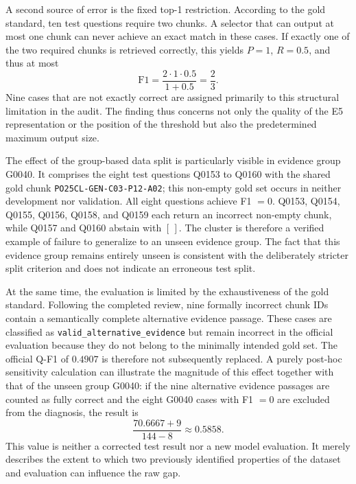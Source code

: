 \documentclass[11pt]{article}
\begin{document}
A second source of error is the fixed top-1 restriction. According to the gold standard, ten test questions require two chunks. A selector that can output at most one chunk can never achieve an exact match in these cases. If exactly one of the two required chunks is retrieved correctly, this yields $P=1$, $R=0.5$, and thus at most
\begin{equation}
\mathrm{F1}=\frac{2\cdot1\cdot0.5}{1+0.5}=\frac{2}{3}.
\end{equation}
Nine cases that are not exactly correct are assigned primarily to this structural limitation in the audit. The finding thus concerns not only the quality of the E5 representation or the position of the threshold but also the predetermined maximum output size.

The effect of the group-based data split is particularly visible in evidence group G0040. It comprises the eight test questions Q0153 to Q0160 with the shared gold chunk \texttt{PO25CL-GEN-C03-P12-A02}; this non-empty gold set occurs in neither development nor validation. All eight questions achieve F1 $=0$. Q0153, Q0154, Q0155, Q0156, Q0158, and Q0159 each return an incorrect non-empty chunk, while Q0157 and Q0160 abstain with $[\,]$. The cluster is therefore a verified example of failure to generalize to an unseen evidence group. The fact that this evidence group remains entirely unseen is consistent with the deliberately stricter split criterion and does not indicate an erroneous test split.

At the same time, the evaluation is limited by the exhaustiveness of the gold standard. Following the completed review, nine formally incorrect chunk IDs contain a semantically complete alternative evidence passage. These cases are classified as \texttt{valid\_alternative\_evidence} but remain incorrect in the official evaluation because they do not belong to the minimally intended gold set. The official Q-F1 of $0.4907$ is therefore not subsequently replaced. A purely post-hoc sensitivity calculation can illustrate the magnitude of this effect together with that of the unseen group G0040: if the nine alternative evidence passages are counted as fully correct and the eight G0040 cases with F1 $=0$ are excluded from the diagnosis, the result is
\begin{equation}
\frac{70.6667+9}{144-8}\approx0.5858.
\end{equation}
This value is neither a corrected test result nor a new model evaluation. It merely describes the extent to which two previously identified properties of the dataset and evaluation can influence the raw gap.
\end{document}
